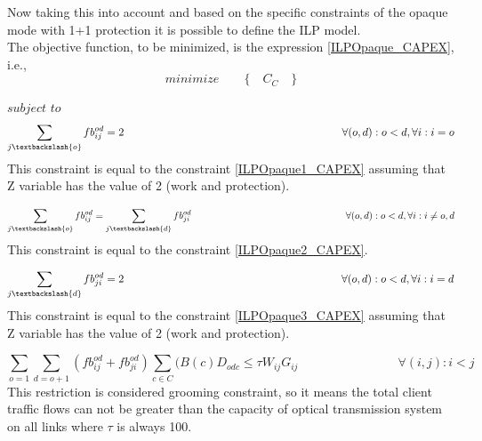 Now taking this into account and based on the specific constraints of the opaque mode with 1+1 protection it is possible to define the ILP model.\\
\newpage
The objective function, to be minimized, is the expression \ref{ILPOpaque_CAPEX}, i.e.,
\begin{equation*}
  minimize \qquad \Big\{ \quad C_C \quad \Big\}
\end{equation*}

$subject$ $to$
\begin{equation}
\sum_{j\textbackslash \{o\}} fb_{ij}^{od} = 2  \qquad \qquad \qquad \qquad \qquad \qquad \qquad \qquad \qquad \qquad
\forall(o,d) : o < d, \forall i: i = o
\label{ILPOpaque1}
\end{equation}
\noindent
This constraint is equal to the constraint \ref{ILPOpaque1_CAPEX} assuming that Z variable has the value of 2 (work and protection).

\begin{equation}
\sum_{j\textbackslash \{o\}} fb_{ij}^{od} = \sum_{j\textbackslash \{d\}} fb_{ji}^{od}   \qquad \qquad \qquad \qquad \qquad \qquad \qquad \qquad
\forall(o,d) : o < d, \forall i: i \neq o,d
\label{ILPOpaque2}
\end{equation}
\noindent
This constraint is equal to the constraint \ref{ILPOpaque2_CAPEX}.

\begin{equation}
\sum_{j\textbackslash \{d\}} fb_{ji}^{od} = 2  \qquad \qquad \qquad \qquad \qquad \qquad \qquad \qquad \qquad \qquad
\forall(o,d) : o < d, \forall i: i = d
\label{ILPOpaque3}
\end{equation}
\noindent
This constraint is equal to the constraint \ref{ILPOpaque3_CAPEX} assuming that Z variable has the value of 2 (work and protection).

\begin{equation}
\sum_{o=1} \sum_{d=o+1} \left(fb_{ij}^{od} + fb_{ji}^{od}\right) \sum_{c\in C} (B\left(c\right) D_{odc}\leq \tau W_{ij} G_{ij} \qquad \qquad \qquad \qquad
\forall(i,j) : i < j
\label{ILPOpaque4}
\end{equation}
\noindent
This restriction is considered grooming constraint, so it means the total client traffic flows can not be greater than the capacity of optical transmission system on all links where $\tau$ is always 100.

